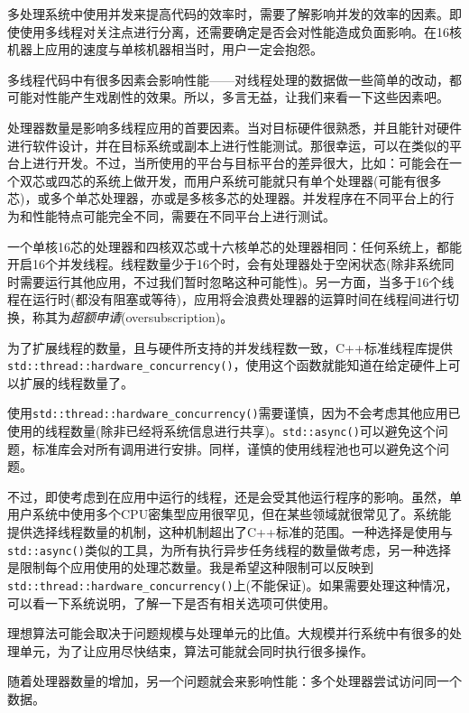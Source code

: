 
多处理系统中使用并发来提高代码的效率时，需要了解影响并发的效率的因素。即使使用多线程对关注点进行分离，还需要确定是否会对性能造成负面影响。在16核机器上应用的速度与单核机器相当时，用户一定会抱怨。

多线程代码中有很多因素会影响性能——对线程处理的数据做一些简单的改动，都可能对性能产生戏剧性的效果。所以，多言无益，让我们来看一下这些因素吧。


处理器数量是影响多线程应用的首要因素。当对目标硬件很熟悉，并且能针对硬件进行软件设计，并在目标系统或副本上进行性能测试。那很幸运，可以在类似的平台上进行开发。不过，当所使用的平台与目标平台的差异很大，比如：可能会在一个双芯或四芯的系统上做开发，而用户系统可能就只有单个处理器(可能有很多芯)，或多个单芯处理器，亦或是多核多芯的处理器。并发程序在不同平台上的行为和性能特点可能完全不同，需要在不同平台上进行测试。

一个单核16芯的处理器和四核双芯或十六核单芯的处理器相同：任何系统上，都能开启16个并发线程。线程数量少于16个时，会有处理器处于空闲状态(除非系统同时需要运行其他应用，不过我们暂时忽略这种可能性)。另一方面，当多于16个线程在运行时(都没有阻塞或等待)，应用将会浪费处理器的运算时间在线程间进行切换，称其为\textit{超额申请}(oversubscription)。

为了扩展线程的数量，且与硬件所支持的并发线程数一致，C++标准线程库提供\texttt{std::thread::hardware\_concurrency()}，使用这个函数就能知道在给定硬件上可以扩展的线程数量了。

使用\texttt{std::thread::hardware\_concurrency()}需要谨慎，因为不会考虑其他应用已使用的线程数量(除非已经将系统信息进行共享)。\texttt{std::async()}可以避免这个问题，标准库会对所有调用进行安排。同样，谨慎的使用线程池也可以避免这个问题。

不过，即使考虑到在应用中运行的线程，还是会受其他运行程序的影响。虽然，单用户系统中使用多个CPU密集型应用很罕见，但在某些领域就很常见了。系统能提供选择线程数量的机制，这种机制超出了C++标准的范围。一种选择是使用与\texttt{std::async()}类似的工具，为所有执行异步任务线程的数量做考虑，另一种选择是限制每个应用使用的处理芯数量。我是希望这种限制可以反映到\texttt{std::thread::hardware\_concurrency()}上(不能保证)。如果需要处理这种情况，可以看一下系统说明，了解一下是否有相关选项可供使用。

理想算法可能会取决于问题规模与处理单元的比值。大规模并行系统中有很多的处理单元，为了让应用尽快结束，算法可能就会同时执行很多操作。

随着处理器数量的增加，另一个问题就会来影响性能：多个处理器尝试访问同一个数据。

